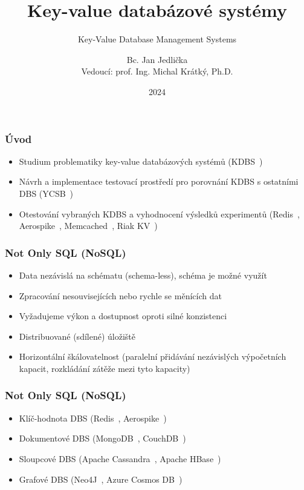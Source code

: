 \documentclass{beamer}
\title[Diplomová práce - KDBS]{Key-value databázové systémy}
\subtitle{Key-Value Database Management Systems}
\author[Bc. Jan Jedlička, JED0050]{Bc. Jan Jedlička \\ {\footnotesize Vedoucí: prof. Ing. Michal Krátký, Ph.D.}}
\institute[]{FEI, VŠB-TUO}
\date{2024}
\begin{document}
	
	\frame{\titlepage}
	
	\begin{frame}[noframenumbering]
		\frametitle{Úvod}
		
		\begin{itemize}
			\item Studium problematiky key-value databázových systémů (KDBS~\cite{amaz-key-value-db})
			\item Návrh a implementace testovací prostředí pro porovnání KDBS s ostatními DBS (YCSB~\cite{ycsb})
			\item Otestování vybraných KDBS a vyhodnocení výsledků experimentů (Redis~\cite{redis}, Aerospike~\cite{aerospike}, Memcached~\cite{memcached}, Riak KV~\cite{riak})
		\end{itemize}
		
	\end{frame}
	
	\begin{frame}
		\frametitle{Not Only SQL (NoSQL)}
		\begin{itemize}
			\item Data nezávislá na schématu (schema-less), schéma je možné využít
			\item Zpracování nesouvisejících nebo rychle se měnících dat~\cite{mic-nosql}
			\item Vyžadujeme výkon a dostupnost oproti silné konzistenci
			\item Distribuované (sdílené) úložiště
			\item Horizontální škálovatelnost (paralelní přidávání nezávislých výpočetních kapacit, rozkládání zátěže mezi tyto kapacity)
		\end{itemize}	
	\end{frame}
	
	\begin{frame}
		\frametitle{Not Only SQL (NoSQL)}
		\begin{itemize}
			\item Klíč-hodnota DBS {\footnotesize(Redis~\cite{redis}, Aerospike~\cite{aerospike})}
			\item Dokumentové DBS {\footnotesize(MongoDB~\cite{mongodb}, CouchDB~\cite{couchdb})}
			\item Sloupcové DBS {\footnotesize(Apache Cassandra~\cite{cassandra}, Apache HBase~\cite{hbase})}
			\item Grafové DBS {\footnotesize(Neo4J~\cite{neo4j}, Azure Cosmos DB~\cite{azure-cosmos-db})}
		\end{itemize}	
	\end{frame}
	
\end{document}
